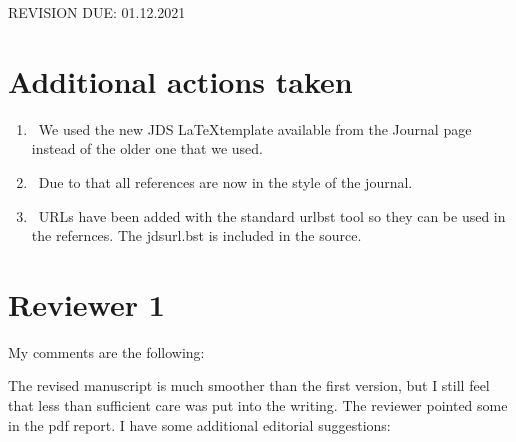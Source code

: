 
\newcommand{\DONE}{{\color{green!60!black}\makebox[0pt][l]{$\square$}\raisebox{.15ex}{\hspace{0.1em}$\checkmark$}}~}
\newcommand{\DOIT}{{\color{red!60!black}\makebox[0pt][l]{$\square$}\raisebox{.15ex}{\hspace{0.1em}$\boxtimes$}}~}
\newcommand{\PROGRESS}{(in progress)~}


REVISION DUE: 01.12.2021

\section{Additional actions taken}

\begin{enumerate}

    \item \DONE We used the new JDS \LaTeX template available from the Journal page instead of the older one that we used.
    
    \item \DONE Due to that all references are now in the style of the journal.
    
    \item \DONE URLs have been added with the standard urlbst tool so they can be used in the refernces. The jdsurl.bst is included in the source.

\end{enumerate}


\section*{Reviewer 1}

My comments are the following:

The revised manuscript is much smoother than the first version, but I still feel that less than sufficient care was put into the writing. The reviewer pointed some in the pdf report. I have some additional editorial suggestions:


